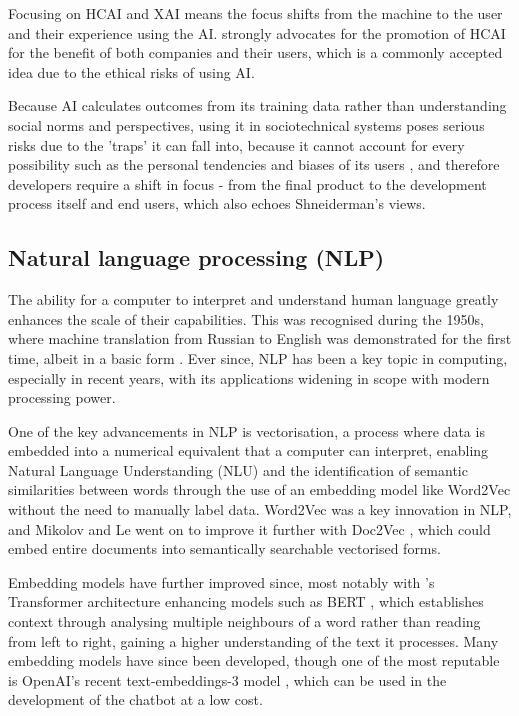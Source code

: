 Focusing on HCAI and XAI means the focus shifts from the machine to the user and their experience 
using the AI. \textcite{AIEthics} strongly advocates for the 
promotion of HCAI for the benefit of both companies and their users, which is a commonly accepted 
idea due to the ethical risks of using AI. 

Because AI calculates outcomes from its training data rather 
than understanding social norms and perspectives, using it in sociotechnical systems poses serious risks 
due to the 'traps' it can fall into, because it cannot account for every possibility such as the personal tendencies 
and biases of its users \autocite{selbst_fairness_2019}, and therefore developers require a shift in focus - from the final product
to the development process itself and end users, which also echoes Shneiderman's views. 

\subsection{Natural language processing (NLP)}
The ability for a computer to interpret and understand human language greatly enhances the scale of their capabilities. This was 
recognised during the 1950s, where machine translation from Russian to English was demonstrated for the first time, albeit in a basic form \autocite{zampolli_natural_1994}.
Ever since, NLP has been a key topic in computing, especially in recent years, with its applications widening 
in scope with modern processing power.

One of the key advancements in NLP is vectorisation, a process where data is embedded into a numerical equivalent that a computer can interpret, 
enabling Natural Language Understanding (NLU) and the identification of semantic similarities between words through the use of an embedding model 
like Word2Vec \autocite{mikolov_efficient_2013} without the need to manually label data. 
Word2Vec was a key innovation in NLP, and Mikolov and Le went on to improve it further with Doc2Vec \autocite{le_distributed_2014}, which could embed 
entire documents into semantically searchable vectorised forms.

Embedding models have further improved since, most notably with \textcite{vaswani_attention_2017}'s Transformer architecture enhancing models such as 
BERT \autocite{devlin_bert_2019}, which establishes context through analysing multiple neighbours of a word rather than reading from left to right,
gaining a higher understanding of the text it processes. Many embedding models have since been developed, though one of the most reputable is OpenAI's 
recent text-embeddings-3 model \autocite{openai_vector_nodate}, which can be used in the development of the chatbot at a low cost. 

